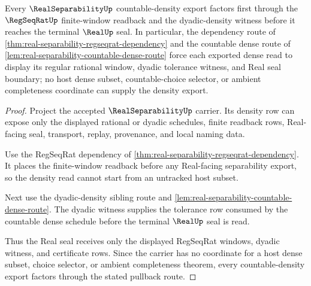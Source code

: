 \begin{theorem}
\label{thm:real-separability-regseqrat-density-pullback}
Every $\RealSeparabilityUp$ countable-density export factors first through the $\RegSeqRatUp$ finite-window readback and the dyadic-density witness before it reaches the terminal $\RealUp$ seal. In particular, the dependency route of \autoref{thm:real-separability-regseqrat-dependency} and the countable dense route of \autoref{lem:real-separability-countable-dense-route} force each exported dense read to display its regular rational window, dyadic tolerance witness, and Real seal boundary; no host dense subset, countable-choice selector, or ambient completeness coordinate can supply the density export.
\end{theorem}
\begin{proof}
Project the accepted $\RealSeparabilityUp$ carrier. Its density row can expose only the displayed rational or dyadic schedules, finite readback rows, Real-facing seal, transport, replay, provenance, and local naming data.

Use the RegSeqRat dependency of \autoref{thm:real-separability-regseqrat-dependency}. It places the finite-window readback before any Real-facing separability export, so the density read cannot start from an untracked host subset.

Next use the dyadic-density sibling route and \autoref{lem:real-separability-countable-dense-route}. The dyadic witness supplies the tolerance row consumed by the countable dense schedule before the terminal $\RealUp$ seal is read.

Thus the Real seal receives only the displayed RegSeqRat windows, dyadic witness, and certificate rows. Since the carrier has no coordinate for a host dense subset, choice selector, or ambient completeness theorem, every countable-density export factors through the stated pullback route.
\end{proof}

